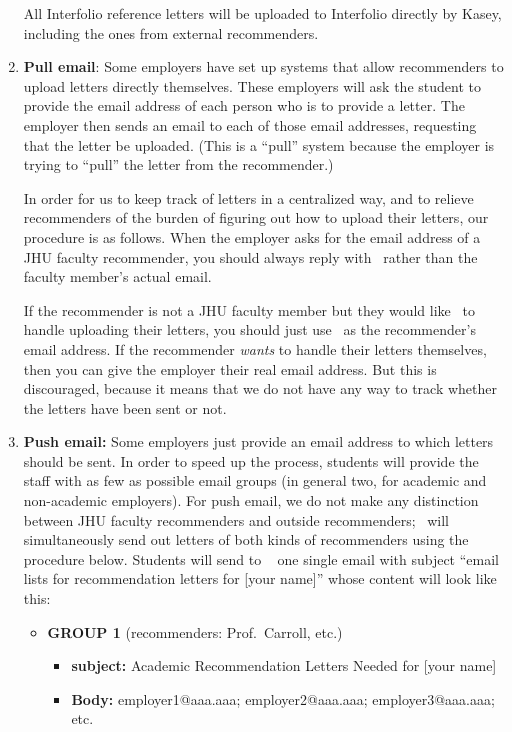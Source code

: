 \documentclass{econtex}
\begin{document}
\begin{enumerate}
All Interfolio reference letters will be uploaded to Interfolio directly by Kasey, including the ones from external recommenders.

\item {\bf Pull email}: Some employers have set up systems that allow
  recommenders to upload letters directly themselves.  These employers
  will ask the student to provide the email address of each person who
  is to provide a letter.  The employer then sends an email to each of
  those email addresses, requesting that the letter be uploaded.
  (This is a ``pull'' system because the employer is trying to
  ``pull'' the letter from the recommender.)

  In order for us to keep track of letters in a centralized way, and
  to relieve recommenders of the burden of figuring out how to
  upload their letters, our procedure is as follows.  When the
  employer asks for the email address of a JHU faculty recommender, you should
  always reply with \JMStaffEmail~rather than the faculty member's
  actual email.

  If the recommender is not a JHU faculty member but they would like \JMStaff~to handle uploading their letters, you should just use \JMStaffEmail~as the recommender's email address.  If the recommender {\it wants} to handle their letters themselves, then you can give the employer their real email address.  But this is discouraged, because it means that we do not have any way to track whether the letters have been sent or not.

\item {\bf Push email:} Some employers just provide an email address
  to which letters should be sent.  In order to speed up the process,
  students will provide the staff with as few as possible email groups
  (in general two, for academic and non-academic employers). For push email, we do not 
make any distinction between JHU faculty recommenders and outside recommenders; \JMStaff~will
simultaneously send out letters of both kinds of recommenders using the procedure below.  Students will send to \JMStaffEmail~ one single email
  with subject ``email lists for recommendation letters for [your
  name]'' whose content will look like this: \small
\begin{itemize}
\item {\bf  GROUP 1} (recommenders: Prof.\ Carroll, etc.)
\begin{itemize}
\item {\bf  subject:} Academic Recommendation Letters Needed for [your name]
\item {\bf  Body:} employer1@aaa.aaa; employer2@aaa.aaa; employer3@aaa.aaa; etc.
\end{itemize}


\end{itemize}
\end{enumerate}
\end{document}
